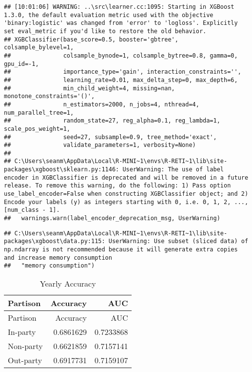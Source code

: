 \documentclass[
  english,
  man]{article}
\begin{document}
\begin{verbatim}
## [10:01:06] WARNING: ..\src\learner.cc:1095: Starting in XGBoost 1.3.0, the default evaluation metric used with the objective 'binary:logistic' was changed from 'error' to 'logloss'. Explicitly set eval_metric if you'd like to restore the old behavior.
## XGBClassifier(base_score=0.5, booster='gbtree', colsample_bylevel=1,
##               colsample_bynode=1, colsample_bytree=0.8, gamma=0, gpu_id=-1,
##               importance_type='gain', interaction_constraints='',
##               learning_rate=0.01, max_delta_step=0, max_depth=6,
##               min_child_weight=4, missing=nan, monotone_constraints='()',
##               n_estimators=2000, n_jobs=4, nthread=4, num_parallel_tree=1,
##               random_state=27, reg_alpha=0.1, reg_lambda=1, scale_pos_weight=1,
##               seed=27, subsample=0.9, tree_method='exact',
##               validate_parameters=1, verbosity=None)
## 
## C:\Users\seanm\AppData\Local\R-MINI~1\envs\R-RETI~1\lib\site-packages\xgboost\sklearn.py:1146: UserWarning: The use of label encoder in XGBClassifier is deprecated and will be removed in a future release. To remove this warning, do the following: 1) Pass option use_label_encoder=False when constructing XGBClassifier object; and 2) Encode your labels (y) as integers starting with 0, i.e. 0, 1, 2, ..., [num_class - 1].
##   warnings.warn(label_encoder_deprecation_msg, UserWarning)
\end{verbatim}

\begin{verbatim}
## C:\Users\seanm\AppData\Local\R-MINI~1\envs\R-RETI~1\lib\site-packages\xgboost\data.py:115: UserWarning: Use subset (sliced data) of np.ndarray is not recommended because it will generate extra copies and increase memory consumption
##   "memory consumption")
\end{verbatim}

\begin{longtable}[]{@{}lrr@{}}
\caption{\label{tab:unnamed-chunk-9}Yearly Accuracy}\tabularnewline
\toprule
Partison & Accuracy & AUC \\
\midrule
\endfirsthead
\toprule
Partison & Accuracy & AUC \\
\midrule
\endhead
In-party & 0.6861629 & 0.7233868 \\
Non-party & 0.6621859 & 0.7157141 \\
Out-party & 0.6917731 & 0.7159107 \\
\bottomrule
\end{longtable}
\end{document}
